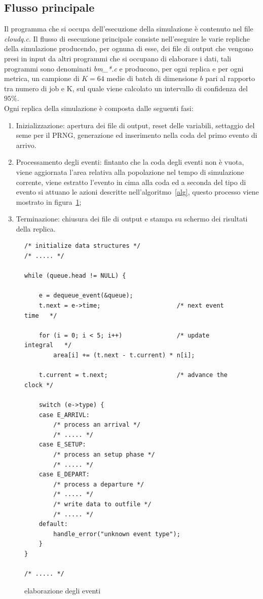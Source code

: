 \subsection{Flusso principale}
Il programma che si occupa dell’esecuzione della simulazione è contenuto nel
file \emph{cloudq.c}. Il flusso di esecuzione principale consiste nell’eseguire
le varie repliche della simulazione producendo, per ognuna di esse, dei file
di output che vengono presi in input da altri programmi che si occupano di
elaborare i dati, tali programmi sono denominati \emph{bm\_*.c} e producono, per
ogni replica e per ogni metrica, un campione di $K=64$ medie di batch di
dimensione $b$ pari al rapporto tra numero di job e K, sul quale viene calcolato
un intervallo di confidenza del $95\%$.
\\Ogni replica della simulazione è composta dalle seguenti fasi:
%
\begin{enumerate}
\item Inizializzazione: apertura dei file di output, reset delle variabili,
settaggio del seme per il PRNG, generazione ed inserimento nella coda del primo
evento di arrivo.
\item Processamento degli eventi: fintanto che la coda degli eventi non è vuota,
viene aggiornata l’area relativa alla popolazione nel tempo di simulazione
corrente, viene estratto l’evento in cima alla coda ed a seconda del tipo di
evento si attuano le azioni descritte nell’algoritmo~\ref{alg}, questo processo
viene mostrato in figura~\ref{code:events};
\item Terminazione: chiusura dei file di output e stampa su schermo dei
risultati della replica.
\end{enumerate}
%
\begin{figure}[!h]
\begin{lstlisting}[title=cloudq.c]
/* initialize data structures */
/* ..... */

while (queue.head != NULL) { 

    e = dequeue_event(&queue);
    t.next = e->time;                     /* next event time   */

    for (i = 0; i < 5; i++)               /* update integral   */
        area[i] += (t.next - t.current) * n[i];

    t.current = t.next;                   /* advance the clock */

    switch (e->type) {
    case E_ARRIVL:              
        /* process an arrival */
        /* ..... */
    case E_SETUP:
        /* process an setup phase */
        /* ..... */
    case E_DEPART: 
        /* process a departure */
        /* ..... */
        /* write data to outfile */
        /* ..... */
    default:
        handle_error("unknown event type");
    }
}

/* ..... */
\end{lstlisting}
\caption{elaborazione degli eventi}
\label{code:events}
\end{figure}
%
